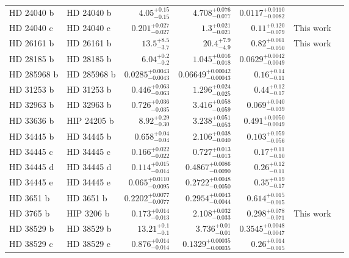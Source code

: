 \begin{longtable*}{llrrrrr}
HD 24040 b & HD 24040 b & $4.05^{+0.15}_{-0.15}$ & $4.708^{+0.076}_{-0.077}$ & $0.0117^{+0.0110}_{-0.0082}$ & \cite{Boisse12} & \\
HD 24040 c & HD 24040 c & $0.201^{+0.027}_{-0.027}$ & $1.3^{+0.021}_{-0.021}$ & $0.11^{+0.120}_{-0.079}$ & This work & \\
HD 26161 b & HD 26161 b & $13.5^{+8.5}_{-3.7}$ & $20.4^{+7.9}_{-4.9}$ & $0.82^{+0.061}_{-0.050}$ & This work & \\
HD 28185 b & HD 28185 b & $6.04^{+0.2}_{-0.2}$ & $1.045^{+0.016}_{-0.018}$ & $0.0629^{+0.0042}_{-0.0049}$ & \cite{Santos01} & \\
HD 285968 b & HD 285968 b & $0.0285^{+0.0043}_{-0.0043}$ & $0.06649^{+0.00042}_{-0.00043}$ & $0.16^{+0.14}_{-0.11}$ & \cite{Forveille09} & \\
HD 31253 b & HD 31253 b & $0.446^{+0.063}_{-0.063}$ & $1.296^{+0.024}_{-0.025}$ & $0.44^{+0.12}_{-0.17}$ & \cite{Meschiari11} & \\
HD 32963 b & HD 32963 b & $0.726^{+0.036}_{-0.035}$ & $3.416^{+0.058}_{-0.059}$ & $0.069^{+0.040}_{-0.039}$ & \cite{Rowan16} & \\
HD 33636 b & HIP 24205 b & $8.92^{+0.29}_{-0.30}$ & $3.238^{+0.051}_{-0.053}$ & $0.491^{+0.0050}_{-0.0049}$ & \cite{Vogt02} & \\
HD 34445 b & HD 34445 b & $0.658^{+0.04}_{-0.04}$ & $2.106^{+0.038}_{-0.040}$ & $0.103^{+0.059}_{-0.056}$ & \cite{Howard10} & \\
HD 34445 c & HD 34445 c & $0.166^{+0.022}_{-0.022}$ & $0.727^{+0.013}_{-0.013}$ & $0.17^{+0.11}_{-0.10}$ & \cite{Vogt17} & \\
HD 34445 d & HD 34445 d & $0.114^{+0.015}_{-0.014}$ & $0.4867^{+0.0086}_{-0.0090}$ & $0.26^{+0.12}_{-0.11}$ & \cite{Vogt17} & \\
HD 34445 e & HD 34445 e & $0.065^{+0.0110}_{-0.0095}$ & $0.2722^{+0.0048}_{-0.0050}$ & $0.35^{+0.19}_{-0.17}$ & \cite{Vogt17} & \\
HD 3651 b & HD 3651 b & $0.2202^{+0.0077}_{-0.0077}$ & $0.2954^{+0.0043}_{-0.0044}$ & $0.614^{+0.015}_{-0.015}$ & \cite{Butler06} & \\
HD 3765 b & HIP 3206 b & $0.173^{+0.014}_{-0.013}$ & $2.108^{+0.032}_{-0.033}$ & $0.298^{+0.078}_{-0.071}$ & This work & \\
HD 38529 b & HD 38529 b & $13.21^{+0.1}_{-0.1}$ & $3.736^{+0.01}_{-0.01}$ & $0.3545^{+0.0048}_{-0.0047}$ & \cite{Fischer01} & \\
HD 38529 c & HD 38529 c & $0.876^{+0.014}_{-0.014}$ & $0.1329^{+0.00035}_{-0.00035}$ & $0.26^{+0.014}_{-0.015}$ & \cite{Butler06} & \\

\end{longtable*}
